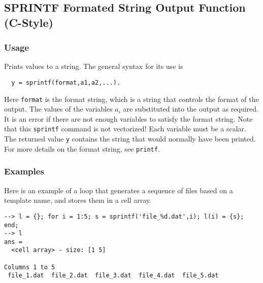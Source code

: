%
%
%
\subsection{SPRINTF Formated String Output Function (C-Style)}
\subsubsection{Usage}
Prints values to a string.  The general syntax for its use is
\begin{verbatim}
  y = sprintf(format,a1,a2,...).
\end{verbatim}
Here \verb|format| is the format string, which is a string that
controls the format of the output.  The values of the variables
$a_i$ are substituted into the output as required.  It is
an error if there are not enough variables to satisfy the format
string.  Note that this \verb|sprintf| command is not vectorized!  Each
variable must be a scalar.  The returned value \verb|y| contains the
string that would normally have been printed. For
more details on the format string, see \verb|printf|.  
\subsubsection{Examples}
Here is an example of a loop that generates a sequence of files based on
a template name, and stores them in a cell array.
\begin{verbatim}
--> l = {}; for i = 1:5; s = sprintf('file_%d.dat',i); l(i) = {s}; end;
--> l
ans =
  <cell array> - size: [1 5]

Columns 1 to 5
 file_1.dat  file_2.dat  file_3.dat  file_4.dat  file_5.dat
\end{verbatim}

